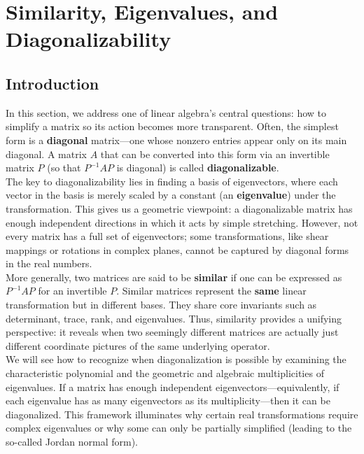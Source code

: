 \documentclass[a4paper, 9pt]{extarticle}
\begin{document}
\section{Similarity, Eigenvalues, and Diagonalizability}
\subsection*{Introduction}
\noindent In this section, we address one of linear algebra’s central questions: how to simplify a matrix so its action becomes more transparent. Often, the simplest form is a \textbf{diagonal} matrix—one whose nonzero entries appear only on its main diagonal. A matrix $A$ that can be converted into this form via an invertible matrix $P$ (so that $P^{-1}AP$ is diagonal) is called \textbf{diagonalizable}. \\[2ex]

\noindent The key to diagonalizability lies in finding a basis of eigenvectors, where each vector in the basis is merely scaled by a constant (an \textbf{eigenvalue}) under the transformation. This gives us a geometric viewpoint: a diagonalizable matrix has enough independent directions in which it acts by simple stretching. However, not every matrix has a full set of eigenvectors; some transformations, like shear mappings or rotations in complex planes, cannot be captured by diagonal forms in the real numbers. \\[2ex]
\noindent More generally, two matrices are said to be \textbf{similar} if one can be expressed as $P^{-1}AP$ for an invertible $P$. Similar matrices represent the \textbf{same} linear transformation but in different bases. They share core invariants such as determinant, trace, rank, and eigenvalues. Thus, similarity provides a unifying perspective: it reveals when two seemingly different matrices are actually just different coordinate pictures of the same underlying operator. \\[2ex]

\noindent We will see how to recognize when diagonalization is possible by examining the characteristic polynomial and the geometric and algebraic multiplicities of eigenvalues. If a matrix has enough independent eigenvectors—equivalently, if each eigenvalue has as many eigenvectors as its multiplicity—then it can be diagonalized. This framework illuminates why certain real transformations require complex eigenvalues or why some can only be partially simplified (leading to the so-called Jordan normal form). \\[2ex]
\end{document}
